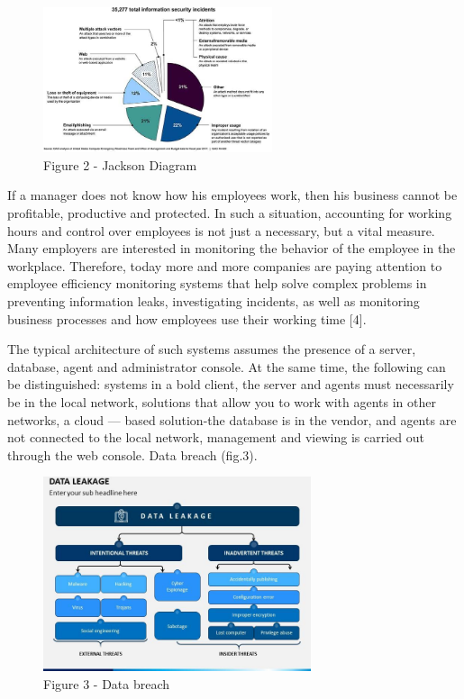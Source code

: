\begin{figure}[H]
	\centering
	\includegraphics[width=0.6\textwidth]{assets/64}
	\caption*{Figure 2 - Jackson Diagram}
\end{figure}

\begin{multicols}{2}
If a manager does not know how his employees work, then his business
cannot be profitable, productive and protected. In such a situation,
accounting for working hours and control over employees is not just a
necessary, but a vital measure. Many employers are interested in
monitoring the behavior of the employee in the workplace. Therefore,
today more and more companies are paying attention to employee
efficiency monitoring systems that help solve complex problems in
preventing information leaks, investigating incidents, as well as
monitoring business processes and how employees use their working time
{[}4{]}.

The typical architecture of such systems assumes the presence of a
server, database, agent and administrator console. At the same time, the
following can be distinguished: systems in a bold client, the server and
agents must necessarily be in the local network, solutions that allow
you to work with agents in other networks, a cloud --- based
solution-the database is in the vendor, and agents are not connected to
the local network, management and viewing is carried out through the web
console. Data breach (fig.3).
\end{multicols}

\begin{figure}[H]
	\centering
	\includegraphics[width=0.7\textwidth]{assets/65}
	\caption*{Figure 3 - Data breach}
\end{figure}

